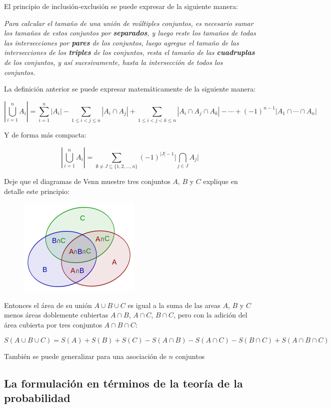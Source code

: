 El principio de inclusión-exclusión se puede expresar de la siguiente manera:

\emph{Para calcular el tamaño de una unión de múltiples conjuntos, es necesario sumar los tamaños de estos conjuntos por \textbf{separados}, y luego reste los tamaños de todas las intersecciones por \textbf{pares} de los conjuntos, luego agregue el tamaño de las intersecciones de los \textbf{triples} de los conjuntos, resta el tamaño de las \textbf{cuadruplas} de los conjuntos, y así sucesivamente, hasta la intersección de todos los conjuntos.}

La definición anterior se puede expresar matemáticamente de la siguiente manera:

$$\left| \bigcup_{i=1}^n A_i \right| = \sum_{i=1}^n|A_i| - \sum_{1\leq i<j\leq n} |A_i \cap A_j| + \sum _{1\leq i<j<k\leq n}|A_i \cap A_j \cap A_k| - \cdots + (-1)^{n-1} | A_1 \cap \cdots \cap A_n |$$

Y de forma más compacta:

$$\left|\bigcup_{i=1}^n A_i \right| = \sum_{\emptyset \neq J\subseteq \{1,2,\ldots ,n\}} (-1)^{|J|-1}{\Biggl |}\bigcap_{j\in J}A_{j}{\Biggr |}$$

Deje que el diagramas de Venn muestre tres conjuntos $A$, $B$ y $C$ explique en detalle este principio:

\begin{figure}[h!]
	\centering
	\includegraphics[width=0.2\linewidth]{img/venn-inclusion-exclusion}
	\label{fig:venn-inclusion-exclusion}
\end{figure}


Entonces el área de su unión $A \cup B \cup C$ es igual a la suma de las areas $A$, $B$ y $C$ menos áreas doblemente cubiertas $A \cap B$, $A \cap C$, $B \cap C$, pero con la adición del área cubierta por tres conjuntos $A \cap B \cap C$:

$$S(A \cup B \cup C) = S(A) + S(B) + S(C) - S(A \cap B) - S(A \cap C) - S(B \cap C) + S(A \cap B \cap C)$$

También se puede generalizar para una asociación de $n$ conjuntos

\subsection{La formulación en términos de la teoría de la probabilidad}

